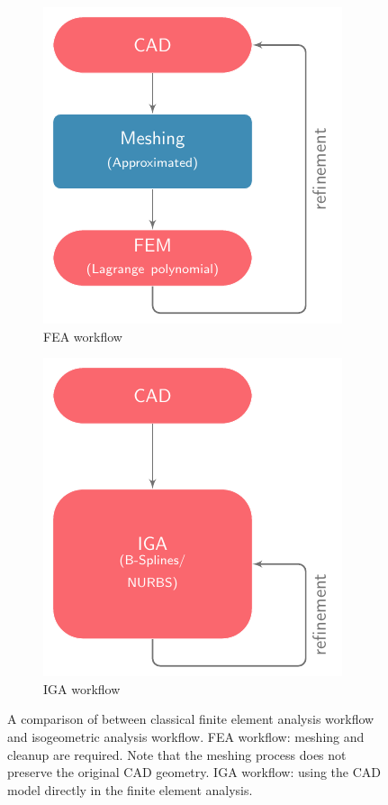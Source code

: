\begin{figure}[ht]
	\captionsetup[subfigure]{labelformat=empty, font = footnotesize}
	\centering
	\begin{subfigure}[b]{0.47\textwidth}
		\centering
		\includegraphics[scale=1.2]{flow-chart-fem}
		\caption{FEA workflow}
	\end{subfigure}
	\begin{subfigure}[b]{0.47\textwidth}
		\centering
		\includegraphics[scale=1.2]{flow-chart-iga}
		\caption{IGA workflow}
	\end{subfigure}
	\caption{A comparison of between classical finite element analysis workflow and isogeometric analysis workflow. FEA workflow: meshing and cleanup are required. Note that the meshing process does not preserve the original CAD geometry. IGA workflow: using the CAD model directly in the finite element analysis. }
	\label{fig:flow_chart}
\end{figure}

